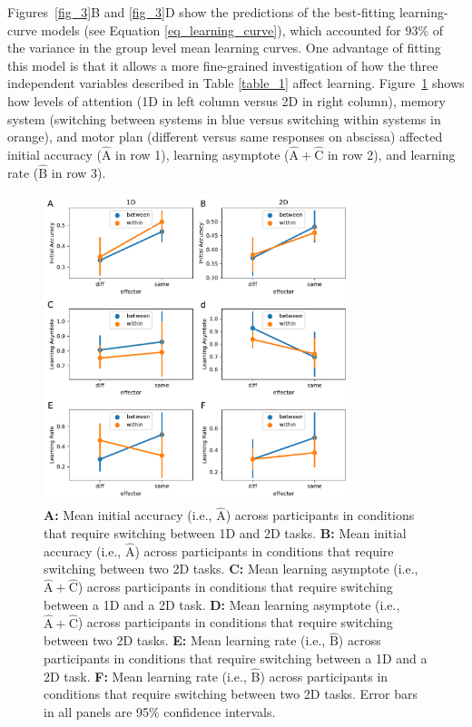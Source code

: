 \documentclass[doc, floatsintext]{apa7}
\begin{document}
Figures~\ref{fig_3}B and \ref{fig_3}D show the predictions
of the best-fitting learning-curve models (see Equation
\ref{eq_learning_curve}), which accounted for 93\% of the
variance in the group level mean learning curves. One
advantage of fitting this model is that it allows a more
fine-grained investigation of how the three independent
variables described in Table \ref{table_1} affect learning.
Figure~\ref{fig_4} shows how levels of attention (1D in left
column versus 2D in right column), memory system (switching
between systems in blue versus switching within systems in
orange), and motor plan (different versus same responses on
abscissa) affected initial accuracy ($\hat{\text{A}}$ in row
1), learning asymptote ($\hat{\text{A}}+\hat{\text{C}}$ in
row 2), and learning rate ($\hat{\text{B}}$ in row 3).

\begin{figure}
    \centering
    \includegraphics[width=0.8\textwidth]{../figures/fig_4.pdf}
    \caption{
        \textbf{A:} Mean initial accuracy (i.e.,
        $\hat{\text{A}}$) across participants in conditions that
        require switching between 1D and 2D tasks.
        \textbf{B:} Mean initial accuracy (i.e.,
        $\hat{\text{A}}$) across participants in conditions that
        require switching between two 2D tasks.
        \textbf{C:} Mean learning asymptote (i.e.,
        $\hat{\text{A}}+\hat{\text{C}}$) across participants in
        conditions that require switching between a 1D and a 2D
        task.
        \textbf{D:} Mean learning asymptote (i.e.,
        $\hat{\text{A}}+\hat{\text{C}}$) across participants in
        conditions that require switching between two 2D tasks.
        \textbf{E:} Mean learning rate (i.e., $\hat{\text{B}}$)
        across participants in conditions that require switching
        between a 1D and a 2D task.
        \textbf{F:} Mean learning rate (i.e., $\hat{\text{B}}$)
        across participants in conditions that require switching
        between two 2D tasks.  Error bars in all panels are 95\%
        confidence intervals.
    }
    \label{fig_4}
\end{figure}
\end{document}
